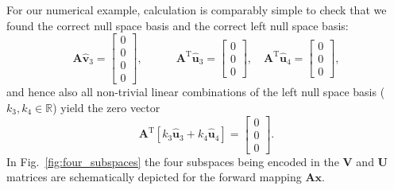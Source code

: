 \documentclass[a4paper, 11pt]{scrartcl}
\begin{document}
For our numerical example, calculation is comparably simple to check that we found the correct null space basis and the correct left null space basis:
$$
\bm{A} \hat{\bm{v}}_3 =
\begin{bmatrix}
0\\0\\0\\0
\end{bmatrix},\qquad\quad
\bm{A}^\mathrm{T} \hat{\bm{u}}_3 =
\begin{bmatrix}
0\\0\\0
\end{bmatrix},\quad
\bm{A}^\mathrm{T} \hat{\bm{u}}_4 =
\begin{bmatrix}
0\\0\\0
\end{bmatrix},
$$
and hence also all non-trivial linear combinations of the left null space basis ($k_3,k_4\in\mathbb{R}$) yield the zero vector
$$
\bm{A}^\mathrm{T} [k_3 \hat{\bm{u}}_3 + k_4 \hat{\bm{u}}_4] =
\begin{bmatrix}
0\\0\\0
\end{bmatrix}.
$$
In Fig.~\ref{fig:four_subspaces} the four subspaces being encoded in the $\bm{V}$ and $\bm{U}$ matrices are schematically depicted for the forward mapping $\bm{A} \bm{x}$.
\end{document}
